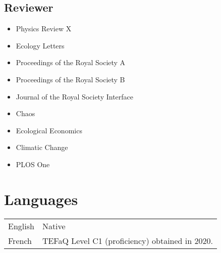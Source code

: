 \documentclass[11pt, a4paper]{article}
\newcommand{\TablePad}{\vspace{-0.4cm}}
\begin{document}

\subsection{Reviewer}

\begin{itemize}
  \item Physics Review X
  \item Ecology Letters
  \item Proceedings of the Royal Society A
  \item Proceedings of the Royal Society B
  \item Journal of the Royal Society Interface
  \item Chaos 
  \item Ecological Economics
  \item Climatic Change
  \item PLOS One

\end{itemize}






\section{Languages}

\TablePad
\begin{tabularx}{\textwidth}{@{}p{} p{}@{}}
  English & Native
  \\
  French & TEFaQ Level C1 (proficiency) obtained in 2020.
\end{tabularx}
\end{document}
